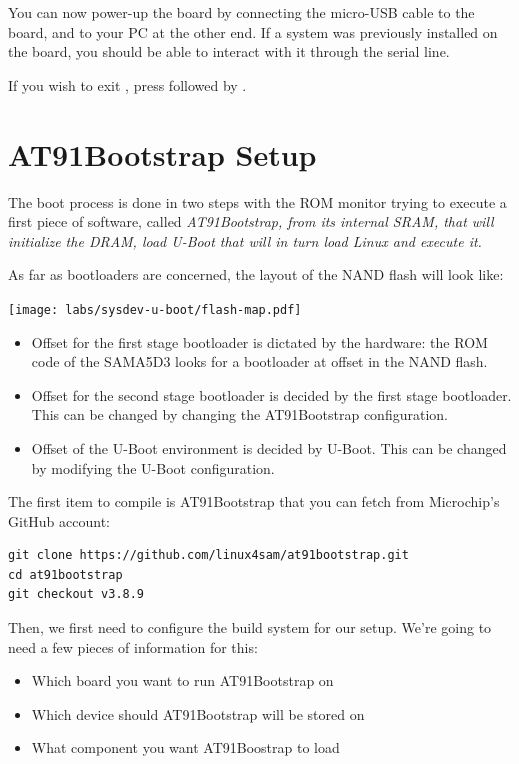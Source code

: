You can now power-up the board by connecting the micro-USB cable to 
the board, and to your PC at the other end. If a system was previously
installed on the board, you should be able to interact with it
through the serial line.

If you wish to exit , press \code{[Ctrl][a]} followed by
\code{[Ctrl][x]}.

\section{AT91Bootstrap Setup}

The boot process is done in two steps with the ROM monitor trying to
execute a first piece of software, called \em{AT91Bootstrap}, from
its internal SRAM, that will initialize the DRAM, load \em{U-Boot}
that will in turn load Linux and execute it.

As far as bootloaders are concerned, the layout of the NAND flash will
look like:

\begin{center}
  \texttt{[image: labs/sysdev-u-boot/flash-map.pdf]}
\end{center}

\begin{itemize}
\item Offset  for the first stage bootloader is dictated by
  the hardware: the ROM code of the SAMA5D3 looks for a bootloader at
  offset  in the NAND flash.
\item Offset  for the second stage bootloader is decided
  by the first stage bootloader. This can be changed by changing the
  AT91Bootstrap configuration.
\item Offset  of the U-Boot environment is decided by
  U-Boot. This can be changed by modifying the U-Boot configuration.
\end{itemize}

The first item to compile is AT91Bootstrap that you can fetch from
Microchip's GitHub account:

\begin{verbatim}
git clone https://github.com/linux4sam/at91bootstrap.git
cd at91bootstrap
git checkout v3.8.9
\end{verbatim}

Then, we first need to configure the build system for our setup. We're
going to need a few pieces of information for this:

\begin{itemize}
\item Which board you want to run AT91Bootstrap on
\item Which device should AT91Bootstrap will be stored on
\item What component you want AT91Boostrap to load
\end{itemize}


